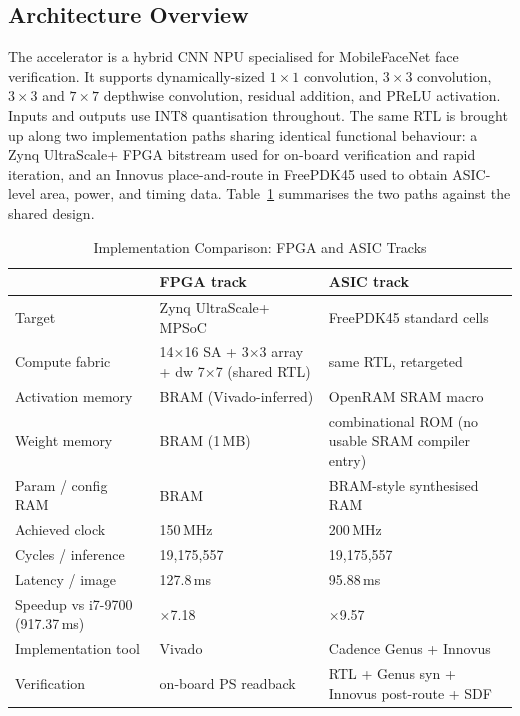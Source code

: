 \subsection{Architecture Overview}
\label{sec:hw:overview}

The accelerator is a hybrid CNN NPU specialised for MobileFaceNet face verification. It supports dynamically-sized $1\times1$ convolution, $3\times3$ convolution, $3\times3$ and $7\times7$ depthwise convolution, residual addition, and PReLU activation. Inputs and outputs use INT8 quantisation throughout. The same RTL is brought up along two implementation paths sharing identical functional behaviour: a Zynq UltraScale+ FPGA bitstream used for on-board verification and rapid iteration, and an Innovus place-and-route in FreePDK45 used to obtain ASIC-level area, power, and timing data. Table~\ref{tab:asic_vs_fpga} summarises the two paths against the shared design.

\begin{table}[H]
\centering
\caption{Implementation Comparison: FPGA and ASIC Tracks}
\label{tab:asic_vs_fpga}
\begin{tabularx}{\textwidth}{l X X}
\toprule
 & \textbf{FPGA track} & \textbf{ASIC track} \\
\midrule
Target              & Zynq UltraScale+ MPSoC          & FreePDK45 standard cells \\
Compute fabric      & 14$\times$16 SA + 3$\times$3 array + dw 7$\times$7 (shared RTL) & same RTL, retargeted \\
Activation memory   & BRAM (Vivado-inferred)          & OpenRAM SRAM macro \\
Weight memory       & BRAM (1\,MB)                    & combinational ROM (no usable SRAM compiler entry) \\
Param / config RAM  & BRAM                            & BRAM-style synthesised RAM \\
Achieved clock      & 150\,MHz                        & 200\,MHz \\
Cycles / inference  & 19{,}175{,}557                  & 19{,}175{,}557 \\
Latency / image     & 127.8\,ms                       & 95.88\,ms \\
Speedup vs i7-9700 (917.37\,ms) & $\times$7.18         & $\times$9.57 \\
Implementation tool & Vivado                          & Cadence Genus + Innovus \\
Verification        & on-board PS readback            & RTL + Genus syn + Innovus post-route + SDF \\
\bottomrule
\end{tabularx}
\end{table}


